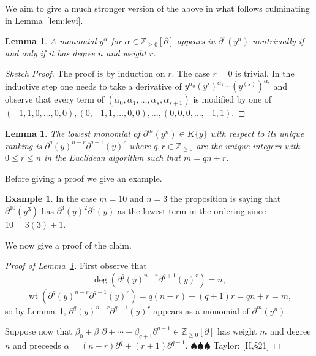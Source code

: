\documentclass[]{article}
\newcommand{\taylor}[1]{{\color{blue} \sf $\spadesuit\spadesuit\spadesuit$ Taylor: [#1]}}
\numberwithin{equation}{section}
\newtheorem{lemma}[theorem]{Lemma}
\theoremstyle{definition}
\newtheorem{example}[theorem]{Example}
\theoremstyle{remark}
\newcommand{\ZZ}{\mathbb{Z}}
\newcommand{\wt}{\operatorname{wt}}
\begin{document}
We aim to give a much stronger version of the above in what follows culminating in Lemma~\ref{lem:levi}.
\begin{lemma}\label{lem:monomials-of-derivative}
A monomial $y^{\alpha}$ for $\alpha \in \ZZ_{\geq 0}[\partial]$ appears in $\partial^r(y^n)$ nontrivially if and only if it has degree $n$ and weight $r$.
\end{lemma}
\begin{proof}[Sketch Proof]
	The proof is by induction on $r$.
	The case $r=0$ is trivial.
	In the inductive step one needs to take a derivative of $y^{\alpha_0} (y')^{\alpha_1}\cdots (y^{(s)})^{\alpha_s}$ and observe that every term of $(\alpha_0, \alpha_1,\ldots, \alpha_s,\alpha_{s+1})$ is modified by one of  $(-1,1,0,\ldots, 0,0), (0,-1,1,\ldots, 0,0), \ldots, (0,0,0, \ldots, -1,1)$. 
\end{proof}

\begin{lemma}\label{lem:lowest-monomial}
	The lowest monomial of $\partial^m(y^n) \in K\lbrace y \rbrace$ with respect to its unique ranking is $\partial^q(y)^{n-r}\partial^{q+1}(y)^r$
	where $q, r \in \ZZ_{\geq 0}$ are the unique integers with $0 \leq r \leq n$ in the Euclidean algorithm such that
	 $m= qn+r$.
\end{lemma}
Before giving a proof we give an example. 
\begin{example}
	In the case $m=10$ and $n=3$ the proposition is saying that $\partial^{10}(y^3)$ has $\partial^3(y)^2\partial^4(y)$ as the lowest term in the ordering since $10=3(3)+1$.
\end{example}
We now give a proof of the claim.
\begin{proof}[Proof of Lemma~\ref{lem:lowest-monomial}]
	First observe that 
	 $$ \deg( \partial^q(y)^{n-r}\partial^{q+1}(y)^r)= n,$$
	 $$ \wt( \partial^q(y)^{n-r}\partial^{q+1}(y)^r) = q(n-r) + (q+1)r  =qn+r =m,$$
	so by Lemma~\ref{lem:monomials-of-derivative}, $\partial^q(y)^{n-r}\partial^{q+1}(y)^r$ appears as a monomial of $\partial^m(y^n)$.

	Suppose now that $\beta_0 + \beta_1 \partial + \cdots + \beta_{q+1} \partial^{q+1} \in \ZZ_{\geq 0}[\partial]$ has weight $m$ and degree $n$ and preceeds $\alpha = (n-r)\partial^q + (r+1) \partial^{q+1}$.
	\taylor{II,\S21}
\end{proof}
\end{document}
